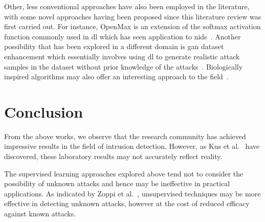 Other, less conventional approaches have also been employed in the literature,
with some novel approaches having been proposed since this literature review
was first carried out. For instance, OpenMax is an extension of the softmax
activation function commonly used in \gls{dl} which has seen application to
\gls{nids}~\cite{openmax}. Another possibility that has been explored in a
different domain is \gls{gan} dataset enhancement which essentially involves
using \gls{dl} to generate realistic attack samples in the dataset without
prior knowledge of the attacks~\cite{gan_enhancement}. Biologically inspired
algorithms may also offer an interesting approach to the field~\cite{AIm}.

\section{Conclusion}%
\label{sec:conclusion2}
From the above works, we observe that the research community has achieved
impressive results in the field of intrusion detection. However, as Kus et
al.~\cite{Kus} have discovered, these laboratory results may not accurately
reflect reality.

The supervised learning approaches explored above tend not to consider the
possibility of unknown attacks and hence may be ineffective in practical
applications. As indicated by Zoppi et al.~\cite{Zoppi}, unsupervised
techniques may be more effective in detecting unknown attacks, however at the
cost of reduced efficacy against known attacks.
